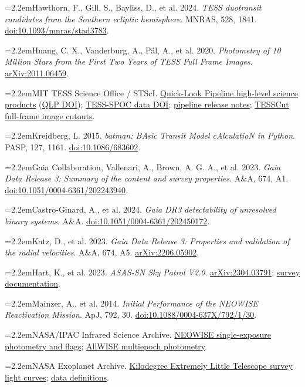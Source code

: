 \documentclass[11pt,a4paper]{article}
\newcommand{\entry}[2]{\par\noindent\hangindent=2.2em\hangafter=1\makebox[2.2em][l]{[#1]}#2\par}
\begin{document}
{\small\setlength{\parskip}{4pt}
\entry{1}{Hawthorn, F., Gill, S., Bayliss, D., et al. 2024. \emph{TESS duotransit candidates from the Southern ecliptic hemisphere}. MNRAS, 528, 1841. \href{https://doi.org/10.1093/mnras/stad3783}{doi:10.1093/mnras/stad3783}.}
\entry{2}{Huang, C. X., Vanderburg, A., P\'al, A., et al. 2020. \emph{Photometry of 10 Million Stars from the First Two Years of TESS Full Frame Images}. \href{https://arxiv.org/abs/2011.06459}{arXiv:2011.06459}.}
\entry{3}{MIT TESS Science Office / STScI. \href{https://archive.stsci.edu/hlsp/qlp}{Quick-Look Pipeline high-level science products} (\href{https://doi.org/10.17909/t9-r086-e880}{QLP DOI}); \href{https://doi.org/10.17909/t9-wpz1-8s54}{TESS-SPOC data DOI}; \href{https://tess.mit.edu/qlp/}{pipeline release notes}; \href{https://mast.stsci.edu/tesscut/}{TESSCut full-frame image cutouts}.}
\entry{4}{Kreidberg, L. 2015. \emph{batman: BAsic Transit Model cAlculatioN in Python}. PASP, 127, 1161. \href{https://doi.org/10.1086/683602}{doi:10.1086/683602}.}
\entry{5}{Gaia Collaboration, Vallenari, A., Brown, A. G. A., et al. 2023. \emph{Gaia Data Release 3: Summary of the content and survey properties}. A\&A, 674, A1. \href{https://doi.org/10.1051/0004-6361/202243940}{doi:10.1051/0004-6361/202243940}.}
\entry{6}{Castro-Ginard, A., et al. 2024. \emph{Gaia DR3 detectability of unresolved binary systems}. A\&A. \href{https://doi.org/10.1051/0004-6361/202450172}{doi:10.1051/0004-6361/202450172}.}
\entry{7}{Katz, D., et al. 2023. \emph{Gaia Data Release 3: Properties and validation of the radial velocities}. A\&A, 674, A5. \href{https://arxiv.org/abs/2206.05902}{arXiv:2206.05902}.}
\entry{8}{Hart, K., et al. 2023. \emph{ASAS-SN Sky Patrol V2.0}. \href{https://arxiv.org/abs/2304.03791}{arXiv:2304.03791}; \href{https://asas-sn.github.io/skypatrol/additional.html}{survey documentation}.}
\entry{9}{Mainzer, A., et al. 2014. \emph{Initial Performance of the NEOWISE Reactivation Mission}. ApJ, 792, 30. \href{https://doi.org/10.1088/0004-637X/792/1/30}{doi:10.1088/0004-637X/792/1/30}.}
\entry{10}{NASA/IPAC Infrared Science Archive. \href{https://irsa.ipac.caltech.edu/data/WISE/docs/release/NEOWISE/expsup/sec2_2.html}{NEOWISE single-exposure photometry and flags}; \href{https://irsa.ipac.caltech.edu/data/WISE/docs/release/AllWISE/expsup/sec3_2.html}{AllWISE multiepoch photometry}.}
\entry{11}{NASA Exoplanet Archive. \href{https://exoplanetarchive.ipac.caltech.edu/docs/KELT.html}{Kilodegree Extremely Little Telescope survey light curves}; \href{https://exoplanetarchive.ipac.caltech.edu/docs/API_kelt_columns.html}{data definitions}.}
}
\end{document}
